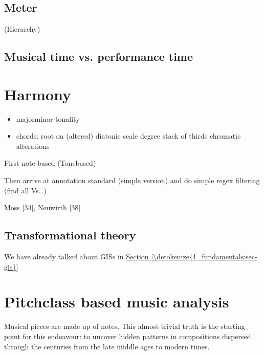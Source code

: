 \documentclass[letterpaper,10pt,english]{sphinxmanual}
\begin{document}
\section{Meter}
\label{\detokenize{4_time:meter}}
\sphinxAtStartPar
(Hierarchy)


\section{Musical time vs. performance time}
\label{\detokenize{4_time:musical-time-vs-performance-time}}

\chapter{Harmony}
\label{\detokenize{4_harmony:harmony}}\label{\detokenize{4_harmony::doc}}\begin{itemize}
\item {} 
\sphinxAtStartPar
major\sphinxhyphen{}minor tonality

\item {} 
\sphinxAtStartPar
chords:
\sphinxhyphen{} root on (altered) diatonic scale degree
\sphinxhyphen{} stack of thirds
\sphinxhyphen{} chromatic alterations

\end{itemize}

\sphinxAtStartPar
First note based (Tone\sphinxhyphen{}based)

\sphinxAtStartPar
Then arrive at annotation standard (simple version)
and do simple regex filtering (find all Vs…)

\sphinxAtStartPar
Moss  {[}\hyperlink{cite.8_bibliography:id44}{34}{]}, Neuwirth  {[}\hyperlink{cite.8_bibliography:id66}{38}{]}


\section{Transformational theory}
\label{\detokenize{4_harmony:transformational-theory}}
\sphinxAtStartPar
We have already talked about GISs in \hyperref[\detokenize{1_fundamentals:sec-gis}]{Section \ref{\detokenize{1_fundamentals:sec-gis}}}


\chapter{Pitch\sphinxhyphen{}class based music analysis}
\label{\detokenize{5_notes:pitch-class-based-music-analysis}}\label{\detokenize{5_notes::doc}}
\sphinxAtStartPar
Musical pieces are made up of notes. This almost trivial truth is the
starting point for this endeavour: to uncover hidden patterns in
compositions dispersed through the centuries from the late middle ages
to modern times.
\end{document}
